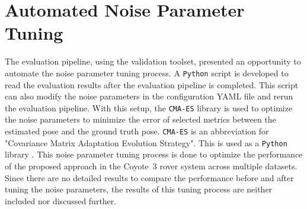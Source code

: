 \documentclass[report.tex]{subfiles}
\begin{document}
    \section{Automated Noise Parameter Tuning}
    
    The evaluation pipeline, using the validation toolset, presented an opportunity to automate the noise parameter tuning process. A \texttt{Python} script is developed to read the evaluation results after the evaluation pipeline is completed. This script can also modify the noise parameters in the configuration YAML file and rerun the evaluation pipeline. With this setup, the \texttt{CMA-ES} library is used to optimize the noise parameters to minimize the error of selected metrics between the estimated pose and the ground truth pose. \texttt{CMA-ES} is an abbreviation for "Covariance Matrix Adaptation Evolution Strategy". This is used as a \texttt{Python} library \cite{nomura2026cmaes}. This noise parameter tuning process is done to optimize the performance of the proposed approach in the Coyote~3 rover system across multiple datasets. Since there are no detailed results to compare the performance before and after tuning the noise parameters, the results of this tuning process are neither included nor discussed further.
\end{document}

